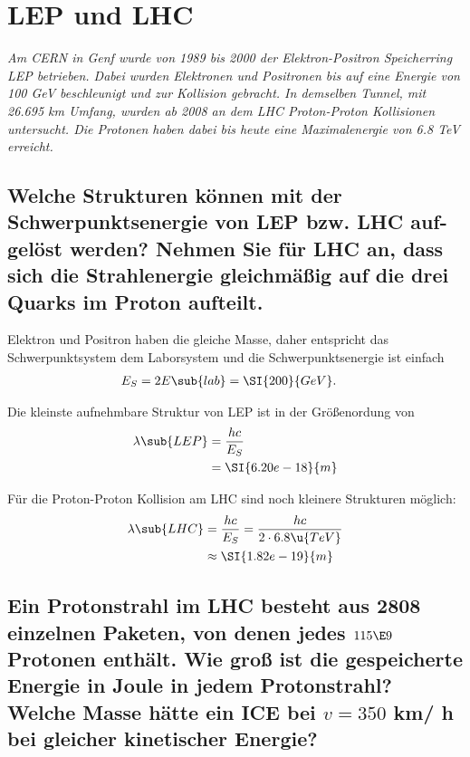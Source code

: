 \documentclass[exb]{exercise_5.0}
\begin{document}
\section{LEP und LHC}
{\it Am CERN in Genf wurde von 1989 bis 2000 der Elektron-Positron Speicherring LEP
betrieben. Dabei wurden Elektronen und Positronen bis auf eine Energie von 100 GeV
beschleunigt und zur Kollision gebracht. In demselben Tunnel, mit 26.695 km Umfang,
wurden ab 2008 an dem LHC Proton-Proton Kollisionen untersucht. Die Protonen haben
dabei bis heute eine Maximalenergie von 6.8 TeV erreicht.}

\subsection
{Welche Strukturen können mit der Schwerpunktsenergie von LEP bzw. LHC auf-
gelöst werden? Nehmen Sie für LHC an, dass sich die Strahlenergie gleichmäßig auf die drei Quarks im Proton aufteilt.}

\dottedlinett

Elektron und Positron haben die gleiche Masse, daher entspricht das Schwerpunktsystem dem Laborsystem und die Schwerpunktsenergie ist einfach
\begin{align*}
    E_S &= 2 E\sub{lab} = \SI{200}{GeV}.
\end{align*}

Die kleinste aufnehmbare Struktur von LEP ist in der Größenordung von 
\begin{align*}
    \lambda\sub{LEP} &= \frac{hc}{E_S}\\
    &= \SI{6.20e-18}{m}
\end{align*}

Für die Proton-Proton Kollision am LHC sind noch kleinere Strukturen möglich:
\begin{align*}
    \lambda\sub{LHC} &= \frac{hc}{E_S} = \frac{hc}{2\cdot 6.8\u{TeV}}\\
    &\approx \SI{1.82e-19}{m}
\end{align*}

\subsection
{Ein Protonstrahl im LHC besteht aus 2808 einzelnen Paketen, von denen jedes
$115\E9$ Protonen enthält. Wie groß ist die gespeicherte Energie in Joule in jedem Protonstrahl? Welche Masse hätte ein ICE bei $v = 350$ km/   h bei gleicher kinetischer Energie?}

\dottedlinett
\end{document}
